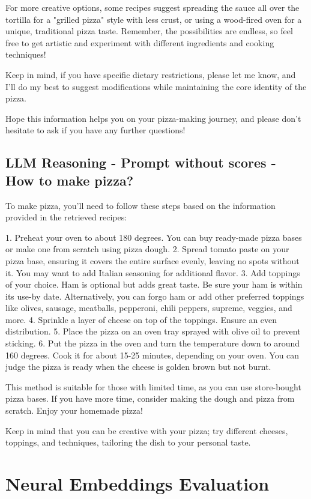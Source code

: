 \documentclass[a4paper,11pt]{article}
\begin{document}
For more creative options, some recipes suggest spreading the sauce all over the tortilla for a "grilled pizza" style with less crust, or using a wood-fired oven for a unique, traditional pizza taste. Remember, the possibilities are endless, so feel free to get artistic and experiment with different ingredients and cooking techniques!

Keep in mind, if you have specific dietary restrictions, please let me know, and I'll do my best to suggest modifications while maintaining the core identity of the pizza.

Hope this information helps you on your pizza-making journey, and please don't hesitate to ask if you have any further questions!

\subsection{LLM Reasoning - Prompt without scores - How to make pizza?}
To make pizza, you'll need to follow these steps based on the information provided in the retrieved recipes:

1. Preheat your oven to about 180 degrees. You can buy ready-made pizza bases or make one from scratch using pizza dough.
2. Spread tomato paste on your pizza base, ensuring it covers the entire surface evenly, leaving no spots without it. You may want to add Italian seasoning for additional flavor.
3. Add toppings of your choice. Ham is optional but adds great taste. Be sure your ham is within its use-by date. Alternatively, you can forgo ham or add other preferred toppings like olives, sausage, meatballs, pepperoni, chili peppers, supreme, veggies, and more.
4. Sprinkle a layer of cheese on top of the toppings. Ensure an even distribution.
5. Place the pizza on an oven tray sprayed with olive oil to prevent sticking.
6. Put the pizza in the oven and turn the temperature down to around 160 degrees. Cook it for about 15-25 minutes, depending on your oven. You can judge the pizza is ready when the cheese is golden brown but not burnt.

This method is suitable for those with limited time, as you can use store-bought pizza bases. If you have more time, consider making the dough and pizza from scratch. Enjoy your homemade pizza!

Keep in mind that you can be creative with your pizza; try different cheeses, toppings, and techniques, tailoring the dish to your personal taste.


\section{Neural Embeddings Evaluation}
\end{document}
